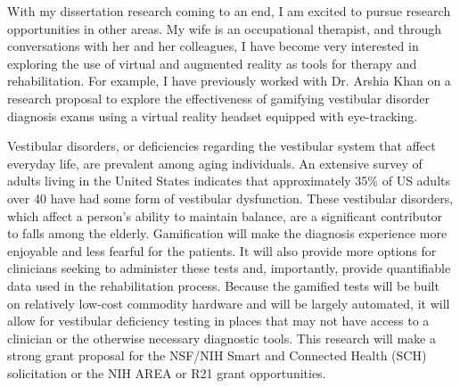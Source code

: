 With my dissertation research coming to an end, I am excited to pursue research opportunities in other areas. My wife is an occupational therapist, and through conversations with her and her colleagues, I have become very interested in exploring the use of virtual and augmented reality as tools for therapy and rehabilitation. For example, I have previously worked with Dr. Arshia Khan on a research proposal to explore the effectiveness of gamifying vestibular disorder diagnosis exams using a virtual reality headset equipped with eye-tracking. 

Vestibular disorders, or deficiencies regarding the vestibular system that affect everyday life, are prevalent among aging individuals. An extensive survey of adults living in the United States indicates that approximately 35\% of US adults over 40 have had some form of vestibular dysfunction. These vestibular disorders, which affect a person’s ability to maintain balance, are a significant contributor to falls among the elderly. Gamification will make the diagnosis experience more enjoyable and less fearful for the patients. It will also provide more options for clinicians seeking to administer these tests and, importantly, provide quantifiable data used in the rehabilitation process. Because the gamified tests will be built on relatively low-cost commodity hardware and will be largely automated, it will allow for vestibular deficiency testing in places that may not have access to a clinician or the otherwise necessary diagnostic tools. This research will make a strong grant proposal for the NSF/NIH Smart and Connected Health (SCH) solicitation or the NIH AREA or R21 grant opportunities.


\label{research_last}
